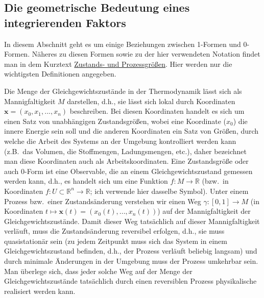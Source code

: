 \subsection{Die geometrische Bedeutung eines integrierenden Faktors}

In diesem Abschnitt geht es um einige Beziehungen 
zwischen 1-Formen und 0-Formen. N\"aheres
zu diesen Formen sowie zu der hier verwendeten Notation 
findet man in dem Kurztext \glqq \hyperref[chap_Zustand]{Zustands- und Prozessgr\"o\ss en}\grqq. Hier
werden nur die wichtigsten Definitionen angegeben. 

Die Menge der Gleichgewichtszust\"ande
in der Thermodynamik l\"asst sich als Mannigfaltigkeit $M$ darstellen, d.h., sie l\"asst sich lokal durch
Koordinaten $\pmb{x}=(x_0,x_1,...,x_n)$ beschreiben. Bei diesen Koordinaten handelt es sich um einen Satz von 
unabh\"angigen Zustandsgr\"o\ss en, wobei eine Koordinate ($x_0$) die innere Energie sein soll und die
anderen Koordinaten ein Satz von Gr\"o\ss en, durch welche die Arbeit des Systems an der Umgebung
kontrolliert werden kann (z.B.\ das Volumen, die Stoffmengen, Ladungsmengen, etc.), daher bezeichnet man
diese Koordinaten auch als Arbeitskoordinaten. Eine 
Zustandsgr\"o\ss e oder auch 0-Form ist eine Observable, die an einem Gleichgewichtszustand gemessen 
werden kann, d.h., es handelt sich um eine Funktion $f:M\rightarrow \mathbb{R}$ (bzw.\ in Koordinaten
$f:U\subset \mathbb{R}^n \rightarrow \mathbb{R}$; ich verwende hier dasselbe Symbol). 
Unter einem
Prozess bzw.\ einer Zustands\"anderung verstehen wir einen Weg $\gamma: [0,1] \rightarrow M$ (in Koordinaten
$t \mapsto \pmb{x}(t)=(x_0(t),...,x_n(t))$) auf der Mannigfaltigkeit der Gleichgewichtszust\"ande. Damit
dieser Weg tats\"achlich auf dieser Mannigfaltigkeit verl\"auft, muss die Zustands\"anderung reversibel 
erfolgen, d.h., sie muss quasistation\"ar sein (zu jedem Zeitpunkt muss sich das System in einem Gleichgewichtszustand
befinden, d.h., der Prozess verl\"auft beliebig langsam) und durch minimale \"Anderungen in der Umgebung
muss der Prozess umkehrbar sein. Man \"uberlege sich, dass jeder solche Weg auf der Menge der
Gleichgewichtszust\"ande tats\"achlich durch einen reversiblen Prozess physikalische realisiert
werden kann.

